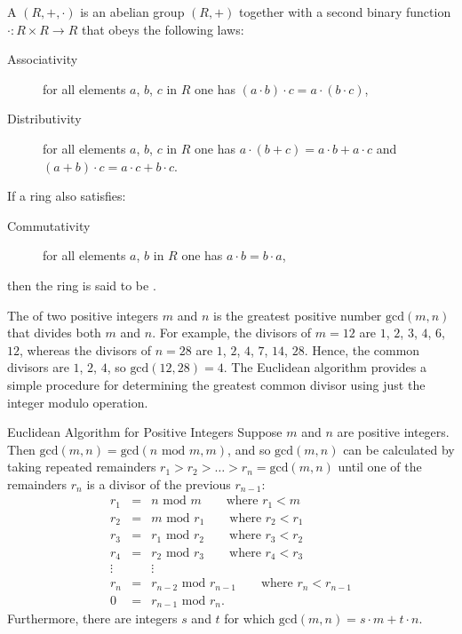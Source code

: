 A  $(R,+,\cdot)$ is an abelian group $(R,+)$ together with a second binary function
$\cdot\colon R\times R\rightarrow R$ that obeys the following laws:
\begin{description}
  \item[Associativity] for all elements $a$, $b$, $c$ in $R$ one has
  $(a\cdot b)\cdot c = a\cdot(b\cdot c)$,
  \item[Distributivity] for all elements $a$, $b$, $c$ in $R$ one has
  $a\cdot(b+c)=a\cdot b + a\cdot c$ and $(a+b)\cdot c=a\cdot c+b\cdot c$.
\end{description}
If a ring also satisfies:
\begin{description}
  \item[Commutativity] for all elements $a$, $b$ in $R$ one has $a\cdot b=b\cdot a$,
\end{description}
then the ring is said to be .

The  of two positive integers $m$ and $n$
is the greatest positive number $\mbox{gcd}(m,n)$ that divides both $m$ and $n$.
For example, the divisors of $m=12$ are $1$, $2$, $3$, $4$, $6$, $12$,
whereas the divisors of $n=28$ are $1$, $2$, $4$, $7$, $14$, $28$.
Hence, the common divisors are $1$, $2$, $4$, so $\mbox{gcd}(12,28)=4$.
The Euclidean algorithm provides a simple procedure for determining the
greatest common divisor using just the integer modulo operation.

\begin{theorem}{Euclidean Algorithm for Positive Integers}
  Suppose $m$ and $n$ are positive integers. Then
  $\mbox{gcd}(m,n)=\mbox{gcd}(n \mbox{ mod } m, m)$,
  and so $\mbox{gcd}(m,n)$ can be calculated by taking repeated remainders
  $r_1>r_2>\dots>r_n=\mbox{gcd}(m,n)$ until one of the remainders $r_n$ is a divisor
  of the previous $r_{n-1}$:
  \begin{eqnarray*}
    r_1 &=& n \mbox{ mod } m \qquad\mbox{where $r_1<m$} \\
    r_2 &=& m \mbox{ mod } r_1 \qquad\mbox{where $r_2<r_1$} \\
    r_3 &=& r_1 \mbox{ mod } r_2 \qquad\mbox{where $r_3<r_2$} \\
    r_4 &=& r_2 \mbox{ mod } r_3 \qquad\mbox{where $r_4<r_3$} \\
    \vdots && \vdots \\
    r_n &=& r_{n-2} \mbox{ mod } r_{n-1} \qquad\mbox{where $r_n<r_{n-1}$} \\
    0 &=& r_{n-1} \mbox{ mod } r_n.
  \end{eqnarray*}
  Furthermore, there are integers $s$ and $t$ for which $\mbox{gcd}(m,n)=s\cdot m+t\cdot n$.
\end{theorem}

